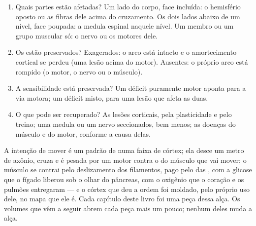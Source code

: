 \begin{method}\label{met:g12:brain-and-movement:locate}
\begin{enumerate}
  \item Quais partes estão afetadas? Um lado do corpo, face incluída: o
        hemisfério oposto ou as fibras dele acima do cruzamento. Os
        dois lados abaixo de um nível, face poupada: a medula espinal
        naquele nível. Um membro ou um grupo muscular só: o nervo ou os
         motores dele.
  \item Os  estão preservados? Exagerados: o arco está intacto
        e o amortecimento cortical se perdeu (uma lesão acima do
         motor). Ausentes: o próprio arco está rompido (o
         motor, o nervo ou o músculo).
  \item A sensibilidade está preservada? Um déficit puramente motor
        aponta para a via motora; um déficit misto, para uma lesão que
        afeta as duas.
  \item O que pode ser recuperado? As lesões corticais, pela
        plasticidade e pelo treino; uma medula ou um nervo seccionados,
        bem menos; as doenças do músculo e do  motor, conforme
        a causa delas.
\end{enumerate}
\end{method}

\begin{remark}\label{rem:g12:brain-and-movement:loop}
A intenção de mover é um padrão de  numa faixa de
córtex; ela desce um metro de axônio, cruza e é pesada por um 
motor contra o  do músculo que vai mover; o músculo se contrai
pelo deslizamento dos filamentos, pago pelo  das , com a
glicose que o fígado liberou sob o olhar do pâncreas, com o oxigênio
que o coração e os pulmões entregaram --- e o córtex que deu a ordem
foi moldado, pelo próprio uso dele, no mapa que ele é. Cada capítulo
deste livro foi uma peça dessa alça. Os volumes que vêm a seguir abrem
cada peça mais um pouco; nenhum deles muda a alça.
\end{remark}

